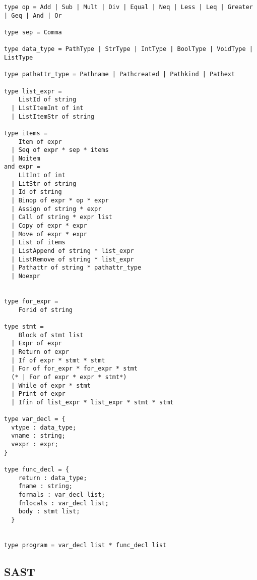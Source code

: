 \documentclass[11pt]{article}
\begin{document}
\begin{listing}[H]
  \begin{verbatim}
type op = Add | Sub | Mult | Div | Equal | Neq | Less | Leq | Greater | Geq | And | Or

type sep = Comma

type data_type = PathType | StrType | IntType | BoolType | VoidType | ListType

type pathattr_type = Pathname | Pathcreated | Pathkind | Pathext

type list_expr =
    ListId of string
  | ListItemInt of int
  | ListItemStr of string

type items =
    Item of expr
  | Seq of expr * sep * items
  | Noitem
and expr =
    LitInt of int
  | LitStr of string
  | Id of string
  | Binop of expr * op * expr
  | Assign of string * expr
  | Call of string * expr list
  | Copy of expr * expr
  | Move of expr * expr
  | List of items
  | ListAppend of string * list_expr
  | ListRemove of string * list_expr
  | Pathattr of string * pathattr_type
  | Noexpr


type for_expr =
    Forid of string

type stmt =
    Block of stmt list
  | Expr of expr
  | Return of expr
  | If of expr * stmt * stmt
  | For of for_expr * for_expr * stmt
  (* | For of expr * expr * stmt*)
  | While of expr * stmt
  | Print of expr
  | Ifin of list_expr * list_expr * stmt * stmt

type var_decl = {
  vtype : data_type;
  vname : string;
  vexpr : expr;
}

type func_decl = {
    return : data_type;
    fname : string;
    formals : var_decl list;
    fnlocals : var_decl list;
    body : stmt list;
  }


type program = var_decl list * func_decl list
\end{verbatim}
\end{listing}

\newpage

\subsection{SAST}
\end{document}
